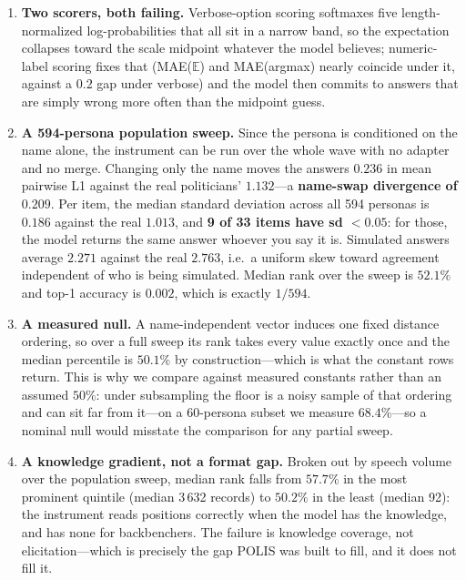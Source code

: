 \documentclass[11pt,letterpaper]{article}
\begin{document}
\begin{enumerate}
    \item \textbf{Two scorers, both failing.} Verbose-option scoring softmaxes five length-normalized log-probabilities that all sit in a narrow band, so the expectation collapses toward the scale midpoint whatever the model believes; numeric-label scoring fixes that (MAE($\mathbb{E}$) and MAE(argmax) nearly coincide under it, against a $0.2$ gap under verbose) and the model then commits to answers that are simply wrong more often than the midpoint guess.
    \item \textbf{A 594-persona population sweep.} Since the persona is conditioned on the name alone, the instrument can be run over the whole wave with no adapter and no merge. Changing only the name moves the answers $0.236$ in mean pairwise L1 against the real politicians' $1.132$---a \textbf{name-swap divergence of $0.209$}. Per item, the median standard deviation across all 594 personas is $0.186$ against the real $1.013$, and \textbf{9 of 33 items have sd $<0.05$}: for those, the model returns the same answer whoever you say it is. Simulated answers average $2.271$ against the real $2.763$, i.e.\ a uniform skew toward agreement independent of who is being simulated. Median rank over the sweep is $52.1\%$ and top-1 accuracy is $0.002$, which is exactly $1/594$.
    \item \textbf{A measured null.} A name-independent vector induces one fixed distance ordering, so over a full sweep its rank takes every value exactly once and the median percentile is $50.1\%$ by construction---which is what the constant rows return. This is why we compare against measured constants rather than an assumed $50\%$: under subsampling the floor is a noisy sample of that ordering and can sit far from it---on a 60-persona subset we measure $68.4\%$---so a nominal null would misstate the comparison for any partial sweep.
    \item \textbf{A knowledge gradient, not a format gap.} Broken out by speech volume over the population sweep, median rank falls from $57.7\%$ in the most prominent quintile (median 3\,632 records) to $50.2\%$ in the least (median 92): the instrument reads positions correctly when the model has the knowledge, and has none for backbenchers. The failure is knowledge coverage, not elicitation---which is precisely the gap POLIS was built to fill, and it does not fill it.
\end{enumerate}
\end{document}
